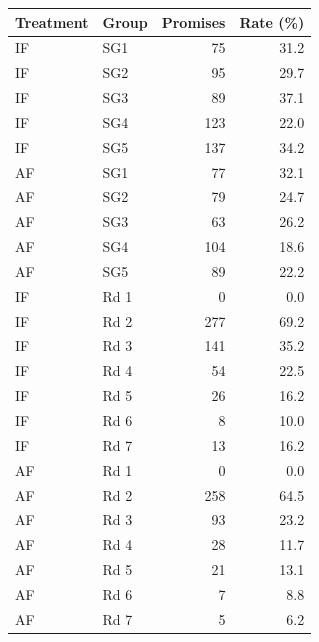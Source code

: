 \begin{tabular}{llrr}
  \toprule
  Treatment & Group & Promises & Rate (\%) \\ 
  \midrule
  IF & SG1 & 75 & 31.2 \\ 
  IF & SG2 & 95 & 29.7 \\ 
  IF & SG3 & 89 & 37.1 \\ 
  IF & SG4 & 123 & 22.0 \\ 
  IF & SG5 & 137 & 34.2 \\ 
  AF & SG1 & 77 & 32.1 \\ 
  AF & SG2 & 79 & 24.7 \\ 
  AF & SG3 & 63 & 26.2 \\ 
  AF & SG4 & 104 & 18.6 \\ 
  AF & SG5 & 89 & 22.2 \\ 
  IF & Rd 1 & 0 & 0.0 \\ 
  IF & Rd 2 & 277 & 69.2 \\ 
  IF & Rd 3 & 141 & 35.2 \\ 
  IF & Rd 4 & 54 & 22.5 \\ 
  IF & Rd 5 & 26 & 16.2 \\ 
  IF & Rd 6 & 8 & 10.0 \\ 
  IF & Rd 7 & 13 & 16.2 \\ 
  AF & Rd 1 & 0 & 0.0 \\ 
  AF & Rd 2 & 258 & 64.5 \\ 
  AF & Rd 3 & 93 & 23.2 \\ 
  AF & Rd 4 & 28 & 11.7 \\ 
  AF & Rd 5 & 21 & 13.1 \\ 
  AF & Rd 6 & 7 & 8.8 \\ 
  AF & Rd 7 & 5 & 6.2 \\ 
  \bottomrule
\end{tabular}
